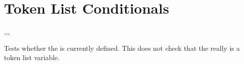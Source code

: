 \documentclass[oneside]{book}
\begin{document}
%

\section{Token List Conditionals}

\begin{function}{\TlIfExist,\TlIfExistT,\TlIfExistF,\TlIfExistTF}
\begin{syntax}
 
  
  
   
\end{syntax}
Tests whether the  is currently defined.  This does not
check that the  really is a token list variable.
\begin{demohigh}
\TlIfExistTF {} {}
\TlIfExistTF {} {}
\end{demohigh}
\end{function}
\end{document}
